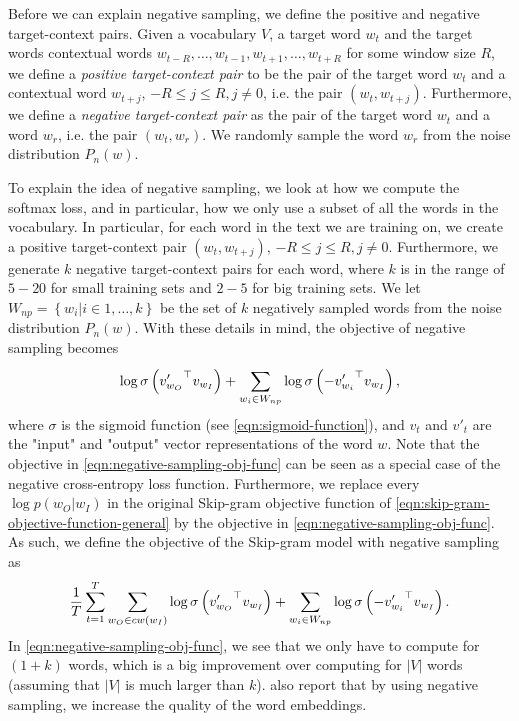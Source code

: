 Before we can explain negative sampling, we define the positive and negative target-context pairs. Given a vocabulary $V$, a target word $w_t$ and the target words contextual words $w_{t-R}, \ldots, w_{t-1}, w_{t+1}, \ldots, w_{t+R}$ for some window size $R$, we define a \textit{positive target-context pair} to be the pair of the target word $w_t$ and a contextual word $w_{t+j}$, $-R \leq j \leq R, j \neq 0$, i.e. the pair $\left( w_t, w_{t+j} \right)$. Furthermore, we define a \textit{negative target-context pair} as the pair of the target word $w_t$ and a word $w_r$, i.e. the pair $\left( w_t, w_r \right)$. We randomly sample the word $w_r$ from the noise distribution $P_n(w)$.

To explain the idea of negative sampling, we look at how we compute the softmax loss, and in particular, how we only use a subset of all the words in the vocabulary. In particular, for each word in the text we are training on, we create a positive target-context pair $\left( w_t, w_{t+j} \right)$, $-R \leq j \leq R, j \neq 0$. Furthermore, we generate $k$ negative target-context pairs for each word, where $k$ is in the range of $5-20$ for small training sets and $2-5$ for big training sets. We let $W_{np} = \left \{ w_i | i \in 1, \ldots, k \right \}$ be the set of $k$ negatively sampled words from the noise distribution $P_n(w)$. With these details in mind, the objective of negative sampling becomes \cite{mikolov2013b, rong2016word2vec}
\begin{align}
    \log \sigma \left( {v'_{w_O}}^\top v_{w_I} \right) + \sum\limits_{w_i \in W_{np}}^{} \log \sigma \left( -{v'_{w_i}}^\top v_{w_I} \right),
    \label{eqn:negative-sampling-obj-func}
\end{align}
where $\sigma$ is the sigmoid function (see \cref{eqn:sigmoid-function}), and $v_t$ and $v'_t$ are the "input" and "output" vector representations of the word $w$. Note that the objective in \cref{eqn:negative-sampling-obj-func} can be seen as a special case of the negative cross-entropy loss function. Furthermore, we replace every $\log p(w_O | w_I)$ in the original Skip-gram objective function of \cref{eqn:skip-gram-objective-function-general} by the objective in \cref{eqn:negative-sampling-obj-func}. As such, we define the objective of the Skip-gram model with negative sampling as
\begin{align}
    \frac{1}{T} \sum\limits_{t=1}^{T} \sum\limits_{w_O \in cw(w_I)}^{} \log \sigma \left( {v'_{w_O}}^\top v_{w_I} \right) + \sum\limits_{w_i \in W_{np}}^{} \log \sigma \left( -{v'_{w_i}}^\top v_{w_I} \right).
    \label{eqn:skip-gram-negative-sampling-objective}
\end{align}
In \cref{eqn:negative-sampling-obj-func}, we see that we only have to compute for $(1 + k)$ words, which is a big improvement over computing for $|V|$ words (assuming that $|V|$ is much larger than $k$). \cite{mikolov2013b} also report that by using negative sampling, we increase the quality of the word embeddings.

